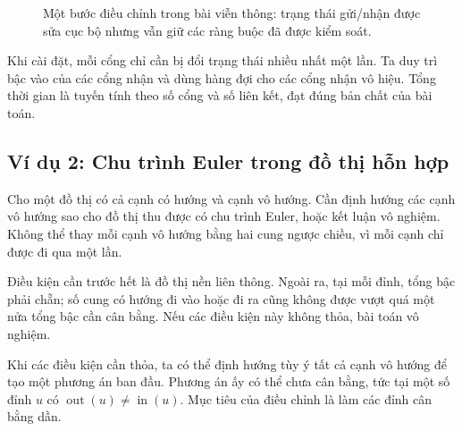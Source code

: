 \documentclass[11pt]{article}
\begin{document}
\begin{figure}[ht]
\centering
{}
\caption{Một bước điều chỉnh trong bài viễn thông: trạng thái gửi/nhận được
sửa cục bộ nhưng vẫn giữ các ràng buộc đã được kiểm soát.}
\end{figure}

Khi cài đặt, mỗi cổng chỉ cần bị đổi trạng thái nhiều nhất một lần. Ta duy trì
bậc vào của các cổng nhận và dùng hàng đợi cho các cổng nhận vô hiệu. Tổng
thời gian là tuyến tính theo số cổng và số liên kết, đạt đúng bản chất của bài
toán.

\subsection{Ví dụ 2: Chu trình Euler trong đồ thị hỗn hợp}

Cho một đồ thị có cả cạnh có hướng và cạnh vô hướng. Cần định hướng các cạnh
vô hướng sao cho đồ thị thu được có chu trình Euler, hoặc kết luận vô nghiệm.
Không thể thay mỗi cạnh vô hướng bằng hai cung ngược chiều, vì mỗi cạnh chỉ
được đi qua một lần.

Điều kiện cần trước hết là đồ thị nền liên thông. Ngoài ra, tại mỗi đỉnh,
tổng bậc phải chẵn; số cung có hướng đi vào hoặc đi ra cũng không được vượt quá
một nửa tổng bậc cần cân bằng. Nếu các điều kiện này không thỏa, bài toán vô
nghiệm.

Khi các điều kiện cần thỏa, ta có thể định hướng tùy ý tất cả cạnh vô hướng để
tạo một phương án ban đầu. Phương án ấy có thể chưa cân bằng, tức tại một số
đỉnh \(u\) có \(\operatorname{out}(u)\ne\operatorname{in}(u)\). Mục tiêu của
điều chỉnh là làm các đỉnh cân bằng dần.
\end{document}
